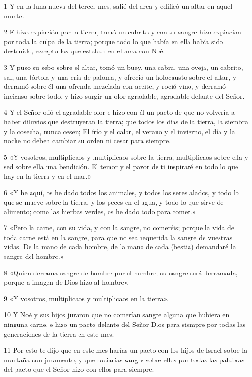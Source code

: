\par 1 Y en la luna nueva del tercer mes, salió del arca y edificó un altar en aquel monte.
\par 2 E hizo expiación por la tierra, tomó un cabrito y con su sangre hizo expiación por toda la culpa de la tierra; porque todo lo que había en ella había sido destruido, excepto los que estaban en el arca con Noé.
\par 3 Y puso su sebo sobre el altar, tomó un buey, una cabra, una oveja, un cabrito, sal, una tórtola y una cría de paloma, y ​​ofreció un holocausto sobre el altar, y derramó sobre él una ofrenda mezclada con aceite, y roció vino, y derramó incienso sobre todo, y hizo surgir un olor agradable, agradable delante del Señor.
\par 4 Y el Señor olió el agradable olor e hizo con él un pacto de que no volvería a haber diluvios que destruyeran la tierra; que todos los días de la tierra, la siembra y la cosecha, nunca cesen; El frío y el calor, el verano y el invierno, el día y la noche no deben cambiar su orden ni cesar para siempre.
\par 5 «Y vosotros, multiplicaos y multiplicaos sobre la tierra, multiplicaos sobre ella y sed sobre ella una bendición. El temor y el pavor de ti inspiraré en todo lo que hay en la tierra y en el mar.»
\par 6 «Y he aquí, os he dado todos los animales, y todos los seres alados, y todo lo que se mueve sobre la tierra, y los peces en el agua, y todo lo que sirve de alimento; como las hierbas verdes, os he dado todo para comer.»
\par 7 «Pero la carne, con su vida, y con la sangre, no comeréis; porque la vida de toda carne está en la sangre, para que no sea requerida la sangre de vuestras vidas. De la mano de cada hombre, de la mano de cada (bestia) demandaré la sangre del hombre.»
\par 8 «Quien derrama sangre de hombre por el hombre, su sangre será derramada, porque a imagen de Dios hizo al hombre».
\par 9 «Y vosotros, multiplicaos y multiplicaos en la tierra».
\par 10 Y Noé y sus hijos juraron que no comerían sangre alguna que hubiera en ninguna carne, e hizo un pacto delante del Señor Dios para siempre por todas las generaciones de la tierra en este mes.
\par 11 Por esto te dijo que en este mes harías un pacto con los hijos de Israel sobre la montaña con juramento, y que rociarías sangre sobre ellos por todas las palabras del pacto que el Señor hizo con ellos para siempre.
